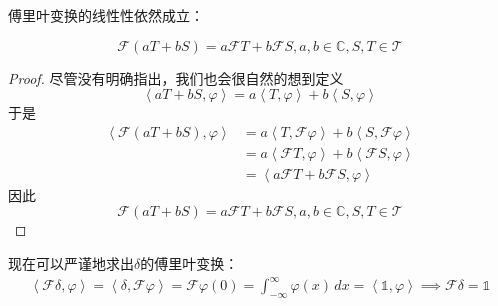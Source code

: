 \documentclass{ctexbook}
\begin{document}
傅里叶变换的线性性依然成立：
\begin{theorem}[分布的傅里叶变换的线性]
    \[\mathcal{F} (aT+bS)=a\mathcal{F} T+b\mathcal{F} S,a,b\in\mathbb{C},S,T\in\mathcal{T}\]
\end{theorem}
\begin{proof}
    尽管没有明确指出，我们也会很自然的想到定义
\begin{equation}
    \left\langle aT+bS,\varphi\right\rangle=a\left\langle T,\varphi\right\rangle+b\left\langle S,\varphi\right\rangle
\end{equation}
于是\begin{align*}
    \left\langle \mathcal{F} (aT+bS),\varphi\right\rangle & =a\left\langle T,\mathcal{F} \varphi\right\rangle+b\left\langle S,\mathcal{F} \varphi\right\rangle                     \\
                                               & =a\left\langle \mathcal{F} T,\varphi\right\rangle+b\left\langle \mathcal{F} S,\varphi\right\rangle                     \\
                                               & =\left\langle a\mathcal{F} T+b\mathcal{F} S,\varphi\right\rangle
\end{align*}
因此
\[\mathcal{F} (aT+bS)=a\mathcal{F} T+b\mathcal{F} S,a,b\in\mathbb{C},S,T\in\mathcal{T}\]
\end{proof}
\begin{example}
    现在可以严谨地求出$\delta$的傅里叶变换：
\begin{align*}
    \left\langle\mathcal{F}\delta,\varphi\right\rangle=\left\langle \delta,\mathcal{F}\varphi\right\rangle=\mathcal{F}\varphi(0)=\int_{-\infty}^{\infty}\varphi(x)\,dx=\left\langle \mathds{1},\varphi\right\rangle\implies\mathcal{F}\delta=\mathds{1}
\end{align*}
\end{example}
\end{document}
